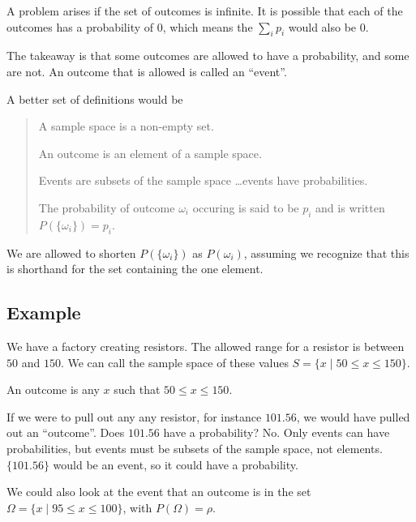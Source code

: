 \documentclass{article}
\begin{document}
A problem arises if the set of outcomes is infinite. It is possible
that each of the outcomes has a probability of $0$, which means the
$\sum_i p_i$ would also be $0$.

The takeaway is that some outcomes are allowed to have a probability,
and some are not. An outcome that is allowed is called an ``event''.

A better set of definitions would be

\begin{quote}
A sample space is a non-empty set.

An outcome is an element of a sample space.

Events are subsets of the sample space \ldots events have
probabilities.

The probability of outcome $\omega_i$ occuring is said to be $p_i$ and
is written $P(\{\omega_i\})=p_i$.
\end{quote}

We are allowed to shorten $P(\{\omega_i\})$ as $P(\omega_i)$, assuming
we recognize that this is shorthand for the set containing the one
element.

\subsection*{Example}

We have a factory creating resistors. The allowed range for a resistor
is between $50$ and $150$. We can call the sample space of these
values $S=\{x\mid 50\le x\le 150\}$.

An outcome is any $x$ such that $50\le x \le 150$.

If we were to pull out any any resistor, for instance $101.56$, we
would have pulled out an ``outcome''. Does $101.56$ have a
probability? No. Only events can have probabilities, but events must
be subsets of the sample space, not elements. $\{101.56\}$ would be an
event, so it could have a probability.

We could also look at the event that an outcome is in the set
$\Omega=\{x\mid 95\le x\le 100\}$, with $P(\Omega)=\rho$.
\end{document}
